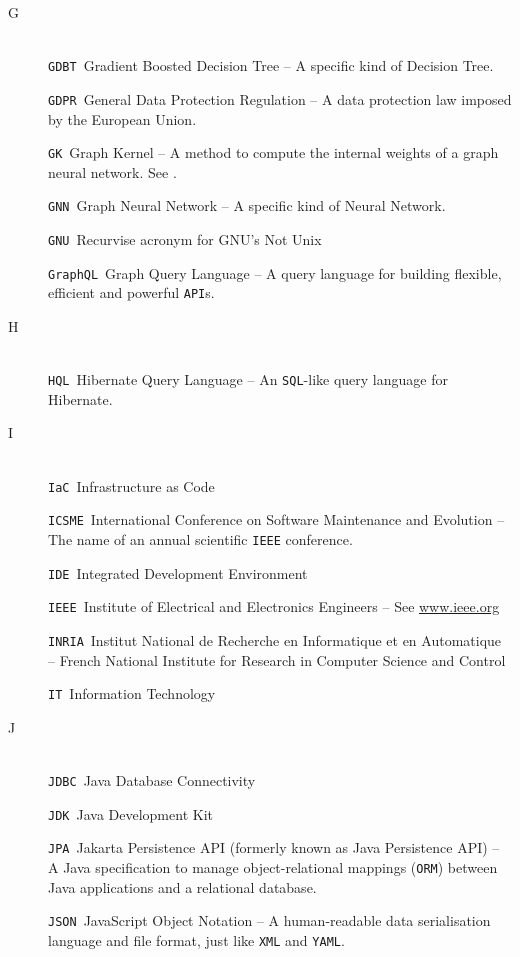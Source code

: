 \begin{description}
\item[G]~\\
\verb|GDBT|\quad~Gradient Boosted Decision Tree -- A specific kind of Decision Tree. %

\verb|GDPR|\quad~General Data Protection Regulation -- A data protection law imposed by the European Union.

\verb|GK|\quad~Graph Kernel -- A method to compute the internal weights of a graph neural network. See .

\verb|GNN|\quad~Graph Neural Network -- A specific kind of Neural Network. %

\verb|GNU|\quad~Recurvise acronym for GNU's Not Unix

\verb|GraphQL|\quad~Graph Query Language -- A query language for building flexible, efficient and powerful \verb|API|s.

\item[H]~\\
\verb|HQL|\quad~Hibernate Query Language -- An \verb|SQL|-like query language for Hibernate.


\item[I]~\\
\verb|IaC|\quad~Infrastructure as Code

\verb|ICSME|\quad~International Conference on Software Maintenance and Evolution -- The name of an annual scientific \verb|IEEE| conference.

\verb|IDE|\quad~Integrated Development Environment

\verb|IEEE|\quad~Institute of Electrical and Electronics Engineers -- See \url{www.ieee.org}

\verb|INRIA|\quad~Institut National de Recherche en Informatique et en Automatique -- French National Institute for Research in Computer Science and Control

\verb|IT|\quad~Information Technology


\item[J]~\\
\verb|JDBC|\quad~Java Database Connectivity

\verb|JDK|\quad~Java Development Kit

\verb|JPA|\quad~Jakarta Persistence API (formerly known as Java Persistence API) -- A Java specification to manage object-relational mappings (\verb|ORM|) between Java applications and a relational database.

\verb|JSON|\quad~JavaScript Object Notation -- A human-readable data serialisation language and file format, just like \verb|XML| and \verb|YAML|.



\end{description}
